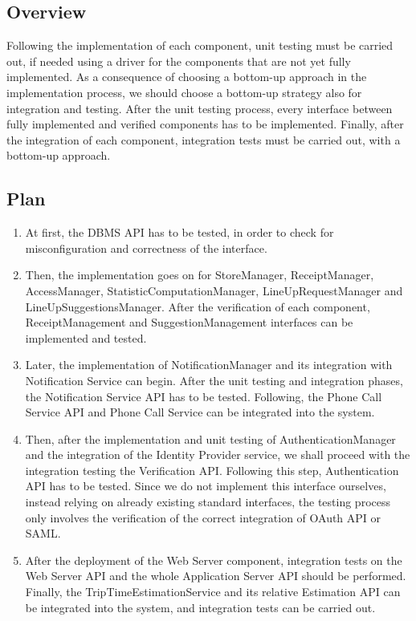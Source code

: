 \documentclass[../../main.tex]{subfiles}
\begin{document}
\subsection{Overview}

Following the implementation of each component, unit testing must be carried out, if needed using a driver for the components that are not yet fully implemented. 
As a consequence of choosing a bottom-up approach in the implementation process, we should choose a bottom-up strategy also for integration and testing. 
After the unit testing process, every interface between fully implemented and verified components has to be implemented. 
Finally, after the integration of each component, integration tests must be carried out, with a bottom-up approach. 

\subsection{Plan}

\begin{enumerate}

	\item At first, the DBMS API has to be tested, in order to check for misconfiguration and correctness of the interface.

	\item Then, the implementation goes on for StoreManager, ReceiptManager, AccessManager, StatisticComputationManager, LineUpRequestManager and LineUpSuggestionsManager. 
	After the verification of each component, ReceiptManagement and SuggestionManagement interfaces can be implemented and tested.

	\item Later, the implementation of NotificationManager and its integration with Notification Service can begin. 
	After the unit testing and integration phases, the Notification Service API has to be tested. 
	Following, the Phone Call Service API and Phone Call Service can be integrated into the system.

	\item Then, after the implementation and unit testing of AuthenticationManager and the integration of the Identity Provider service, we shall proceed with the integration testing the Verification API. 
	Following this step, Authentication API has to be tested. Since we do not implement this interface ourselves, instead relying on already existing standard interfaces, the testing process only involves the verification of the correct integration of OAuth API or SAML.

	\item After the deployment of the Web Server component, integration tests on the Web Server API and the whole Application Server API should be performed. 
	Finally, the TripTimeEstimationService and its relative Estimation API can be integrated into the system, and integration tests can be carried out. 

\end{enumerate}
\end{document}
